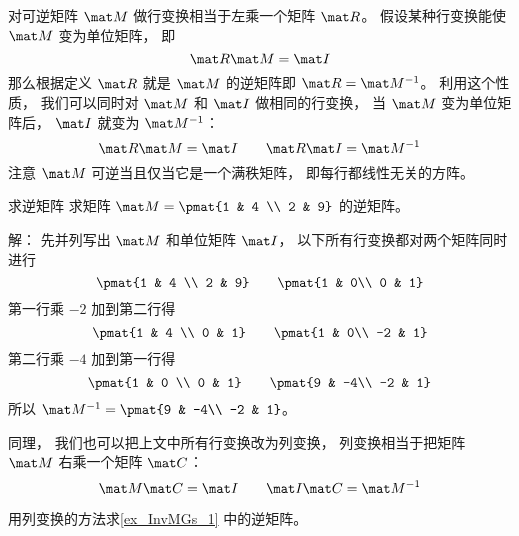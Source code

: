 

对可逆矩阵 $\mat M$ 做行变换相当于左乘一个矩阵 $\mat R$。 假设某种行变换能使 $\mat M$ 变为单位矩阵， 即
\begin{equation}
\mat R \mat M = \mat I
\end{equation}
那么根据定义 $\mat R$ 就是 $\mat M$ 的逆矩阵即 $\mat R = \mat M^{-1}$。 利用这个性质， 我们可以同时对 $\mat M$ 和 $\mat I$ 做相同的行变换， 当 $\mat M$ 变为单位矩阵后， $\mat I$ 就变为 $\mat M^{-1}$：
\begin{equation}
\mat R\mat M = \mat I
\qquad
\mat R \mat I = \mat M^{-1}
\end{equation}
注意 $\mat M$ 可逆当且仅当它是一个满秩矩阵， 即每行都线性无关的方阵。

\begin{example}{求逆矩阵}\label{ex_InvMGs_1}
求矩阵 $\mat M = \pmat{1 & 4 \\ 2 & 9}$ 的逆矩阵。

解： 先并列写出 $\mat M$ 和单位矩阵 $\mat I$， 以下所有行变换都对两个矩阵同时进行
\begin{equation}
\pmat{1 & 4 \\ 2 & 9} \qquad \pmat{1 & 0\\ 0 & 1}
\end{equation}
第一行乘 $-2$ 加到第二行得
\begin{equation}
\pmat{1 & 4 \\ 0 & 1} \qquad \pmat{1 & 0\\ -2 & 1}
\end{equation}
第二行乘 $-4$ 加到第一行得
\begin{equation}
\pmat{1 & 0 \\ 0 & 1} \qquad \pmat{9 & -4\\ -2 & 1}
\end{equation}
所以 $\mat M^{-1} = \pmat{9 & -4\\ -2 & 1}$。
\end{example}

同理， 我们也可以把上文中所有行变换改为列变换， 列变换相当于把矩阵 $\mat M$ 右乘一个矩阵 $\mat C$：
\begin{equation}
\mat M\mat C = \mat I
\qquad
\mat I\mat C = \mat M^{-1}
\end{equation}
\begin{exercise}{}
用列变换的方法求\autoref{ex_InvMGs_1} 中的逆矩阵。
\end{exercise}
